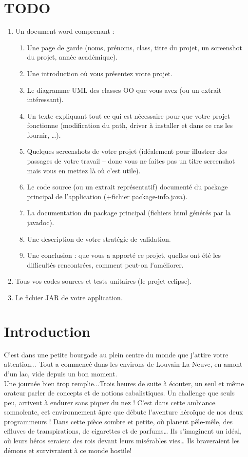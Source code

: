 \documentclass[a4paper,titlepage]{article}
\begin{document}
	\section*{TODO}
	\begin{enumerate}
		\item Un document word comprenant : 
		\begin{enumerate}
			\item Une page de garde (noms, prénoms, class, titre du projet, un screenshot du projet, année académique).
			\item Une introduction où vous présentez votre projet.
			\item Le diagramme UML des classes OO que vous avez (ou un extrait intéressant).
			\item Un texte expliquant tout ce qui est nécessaire pour que votre projet fonctionne (modification du path, driver à installer et dans ce cas les fournir, …).
			\item Quelques screenshots de votre projet (idéalement pour illustrer des passages de votre travail – donc vous ne faites pas un titre screenshot mais vous en mettez là où c’est utile).
			\item Le code source (ou un extrait représentatif) documenté du package principal de l’application (+fichier package-info.java).
			\item La documentation du package principal (fichiers html générés par la javadoc).
			\item Une description de votre stratégie de validation.
			\item Une conclusion : que vous a apporté ce projet, quelles ont été les difficultés rencontrées, comment peut-on l’améliorer.
		\end{enumerate}
		\item Tous vos codes sources et tests unitaires (le projet eclipse).
		\item Le fichier JAR de votre application.
	\end{enumerate}
	\clearpage
	\section{Introduction}
	
	C’est dans une petite bourgade au plein centre du monde que j’attire votre attention... Tout a commencé dans les environs de Louvain-La-Neuve, en amont d’un lac, vide depuis un bon moment.\\

	Une journée bien trop remplie...Trois heures de suite à écouter, un seul et même orateur parler de concepts et de notions cabalistiques. Un challenge que seuls peu, arrivent à endurer sans piquer du nez ! C’est dans cette ambiance somnolente, cet environnement âpre que débute l’aventure héroïque de nos deux programmeurs ! Dans cette pièce sombre et petite, où planent pêle-mêle, des effluves de transpirations, de cigarettes et de parfums… Ils s’imaginent un idéal, où leurs héros seraient des rois devant leurs misérables vies… Ils braveraient les démons et survivraient à ce monde hostile!\\
\end{document}
